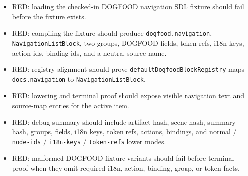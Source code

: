 \begin{itemize}
\tightlist
\item
  RED: loading the checked-in DOGFOOD navigation SDL fixture should fail before the fixture exists.
\item
  RED: compiling the fixture should produce \texttt{d\allowbreak{}o\allowbreak{}g\allowbreak{}f\allowbreak{}o\allowbreak{}o\allowbreak{}d\allowbreak{}.\allowbreak{}n\allowbreak{}a\allowbreak{}v\allowbreak{}i\allowbreak{}g\allowbreak{}a\allowbreak{}t\allowbreak{}i\allowbreak{}o\allowbreak{}n}, \texttt{N\allowbreak{}a\allowbreak{}v\allowbreak{}i\allowbreak{}g\allowbreak{}a\allowbreak{}t\allowbreak{}i\allowbreak{}o\allowbreak{}n\allowbreak{}L\allowbreak{}i\allowbreak{}s\allowbreak{}t\allowbreak{}B\allowbreak{}l\allowbreak{}o\allowbreak{}c\allowbreak{}k}, two groups, DOGFOOD fields, token refs, i18n keys, action ids, binding ids, and a neutral source name.
\item
  RED: registry alignment should prove \texttt{d\allowbreak{}e\allowbreak{}f\allowbreak{}a\allowbreak{}u\allowbreak{}l\allowbreak{}t\allowbreak{}D\allowbreak{}o\allowbreak{}g\allowbreak{}f\allowbreak{}o\allowbreak{}o\allowbreak{}d\allowbreak{}B\allowbreak{}l\allowbreak{}o\allowbreak{}c\allowbreak{}k\allowbreak{}R\allowbreak{}e\allowbreak{}g\allowbreak{}i\allowbreak{}s\allowbreak{}t\allowbreak{}r\allowbreak{}y} maps \texttt{d\allowbreak{}o\allowbreak{}c\allowbreak{}s\allowbreak{}.\allowbreak{}n\allowbreak{}a\allowbreak{}v\allowbreak{}i\allowbreak{}g\allowbreak{}a\allowbreak{}t\allowbreak{}i\allowbreak{}o\allowbreak{}n} to \texttt{N\allowbreak{}a\allowbreak{}v\allowbreak{}i\allowbreak{}g\allowbreak{}a\allowbreak{}t\allowbreak{}i\allowbreak{}o\allowbreak{}n\allowbreak{}L\allowbreak{}i\allowbreak{}s\allowbreak{}t\allowbreak{}B\allowbreak{}l\allowbreak{}o\allowbreak{}c\allowbreak{}k}.
\item
  RED: lowering and terminal proof should expose visible navigation text and source-map entries for the active item.
\item
  RED: debug summary should include artifact hash, scene hash, summary hash, groups, fields, i18n keys, token refs, actions, bindings, and normal / \texttt{n\allowbreak{}o\allowbreak{}d\allowbreak{}e\allowbreak{}-\allowbreak{}i\allowbreak{}d\allowbreak{}s} / \texttt{i\allowbreak{}1\allowbreak{}8\allowbreak{}n\allowbreak{}-\allowbreak{}k\allowbreak{}e\allowbreak{}y\allowbreak{}s} / \texttt{t\allowbreak{}o\allowbreak{}k\allowbreak{}e\allowbreak{}n\allowbreak{}-\allowbreak{}r\allowbreak{}e\allowbreak{}f\allowbreak{}s} lower modes.
\item
  RED: malformed DOGFOOD fixture variants should fail before terminal proof when they omit required i18n, action, binding, group, or token facts.
\end{itemize}

